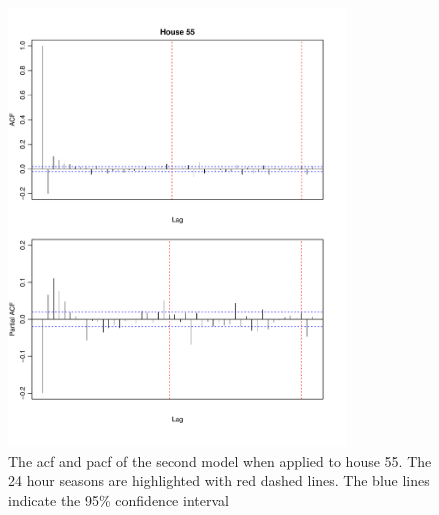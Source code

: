  \begin{figure}
    \centering
    \includegraphics[width=0.8\textwidth]{../../../figures/arimax/ACF_55_short.pdf}
    \caption{The acf and pacf of the second model when applied to house 55. The 24 hour seasons are highlighted with red dashed lines. The blue lines indicate the 95\% confidence interval}
    \label{fig:Model2_acf_55}
\end{figure}    


